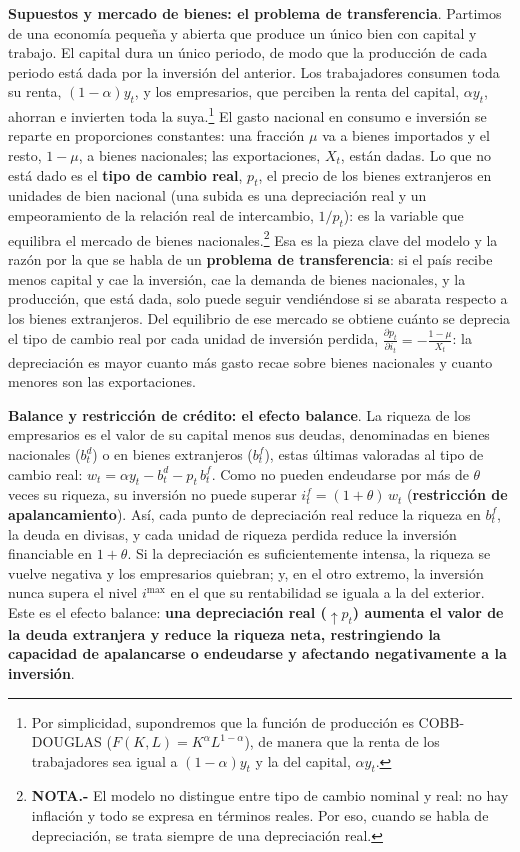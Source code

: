 \documentclass[10pt,a4paper]{article}
\begin{document}
\textbf{Supuestos y mercado de bienes: el problema de transferencia}. Partimos de una economía pequeña y abierta que produce un único bien con capital y trabajo. El capital dura un único periodo, de modo que la producción de cada periodo está dada por la inversión del anterior. Los trabajadores consumen toda su renta, $(1-\alpha)y_t$, y los empresarios, que perciben la renta del capital, $\alpha y_t$, ahorran e invierten toda la suya.\footnote{%
    Por simplicidad, supondremos que la función de producción es COBB-DOUGLAS ($F(K,L)=K^\alpha L^{1-\alpha}$), de manera que la renta de los trabajadores sea igual a $(1-\alpha)y_t$ y la del capital, $\alpha y_t$.
} El gasto nacional en consumo e inversión se reparte en proporciones constantes: una fracción $\mu$ va a bienes importados y el resto, $1-\mu$, a bienes nacionales; las exportaciones, $X_t$, están dadas. Lo que no está dado es el \textbf{tipo de cambio real}, $p_t$, el precio de los bienes extranjeros en unidades de bien nacional (una subida es una depreciación real y un empeoramiento de la relación real de intercambio, $1/p_t$): es la variable que equilibra el mercado de bienes nacionales.\footnote{%
    \textbf{NOTA.-} El modelo no distingue entre tipo de cambio nominal y real: no hay inflación y todo se expresa en términos reales. Por eso, cuando se habla de depreciación, se trata siempre de una depreciación real.
} Esa es la pieza clave del modelo y la razón por la que se habla de un \textbf{problema de transferencia}: si el país recibe menos capital y cae la inversión, cae la demanda de bienes nacionales, y la producción, que está dada, solo puede seguir vendiéndose si se abarata respecto a los bienes extranjeros. Del equilibrio de ese mercado se obtiene cuánto se deprecia el tipo de cambio real por cada unidad de inversión perdida, $\frac{\partial p_t}{\partial i_t}=-\frac{1-\mu}{X_t}$: la depreciación es mayor cuanto más gasto recae sobre bienes nacionales y cuanto menores son las exportaciones.

\textbf{Balance y restricción de crédito: el efecto balance}. La riqueza de los empresarios es el valor de su capital menos sus deudas, denominadas en bienes nacionales ($b_t^d$) o en bienes extranjeros ($b_t^f$), estas últimas valoradas al tipo de cambio real: $w_t=\alpha y_t-b_t^d-p_t\,b_t^f$. Como no pueden endeudarse por más de $\theta$ veces su riqueza, su inversión no puede superar $i_t^f=(1+\theta)\,w_t$ (\textbf{restricción de apalancamiento}). Así, cada punto de depreciación real reduce la riqueza en $b_t^f$, la deuda en divisas, y cada unidad de riqueza perdida reduce la inversión financiable en $1+\theta$. Si la depreciación es suficientemente intensa, la riqueza se vuelve negativa y los empresarios quiebran; y, en el otro extremo, la inversión nunca supera el nivel $i^{\max}$ en el que su rentabilidad se iguala a la del exterior. Este es el efecto balance: \textbf{una depreciación real ($\uparrow p_t$) aumenta el valor de la deuda extranjera y reduce la riqueza neta, restringiendo la capacidad de apalancarse o endeudarse y afectando negativamente a la inversión}.
\end{document}
